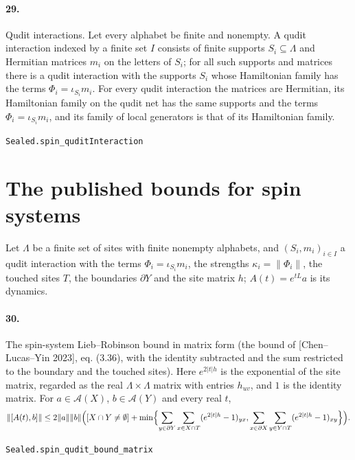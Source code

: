 \documentclass[11pt]{article}
\begin{document}
\paragraph{29.} Qudit interactions. Let every alphabet be finite and nonempty. A qudit interaction indexed by a finite set $I$ consists of finite supports $S_i \subseteq \Lambda$ and Hermitian matrices $m_i$ on the letters of $S_i$; for all such supports and matrices there is a qudit interaction with the supports $S_i$ whose Hamiltonian family has the terms $\Phi_i = \iota_{S_i} m_i$. For every qudit interaction the matrices are Hermitian, its Hamiltonian family on the qudit net has the same supports and the terms $\Phi_i = \iota_{S_i} m_i$, and its family of local generators is that of its Hamiltonian family.\par{\footnotesize\texttt{Sealed.spin\_quditInteraction}}

\section*{The published bounds for spin systems}
Let $\Lambda$ be a finite set of sites with finite nonempty alphabets, and $(S_i, m_i)_{i \in I}$ a qudit interaction with the terms $\Phi_i = \iota_{S_i} m_i$, the strengths $\kappa_i = \|\Phi_i\|$, the touched sites $T$, the boundaries $\partial Y$ and the site matrix $h$; $A(t) = e^{tL} a$ is its dynamics.

\paragraph{30.} The spin-system Lieb–Robinson bound in matrix form (the bound of [Chen–Lucas–Yin 2023], eq. (3.36), with the identity subtracted and the sum restricted to the boundary and the touched sites). Here $e^{2|t|h}$ is the exponential of the site matrix, regarded as the real $\Lambda \times \Lambda$ matrix with entries $h_{u v}$, and $1$ is the identity matrix. For $a \in \mathcal A(X)$, $b \in \mathcal A(Y)$ and every real $t$, \[\|[A(t), b]\| \le 2\|a\|\|b\|\Bigl([X \cap Y \neq \emptyset] + \min\Bigl\{ \sum_{y \in \partial Y} \sum_{x \in X \cap T} (e^{2|t|h} - 1)_{y x}, \sum_{x \in \partial X} \sum_{y \in Y \cap T} (e^{2|t|h} - 1)_{x y}\Bigr\}\Bigr).\]\par{\footnotesize\texttt{Sealed.spin\_qudit\_bound\_matrix}}
\end{document}

